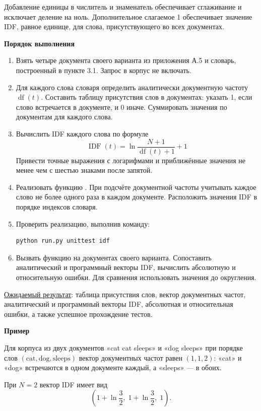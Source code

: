 \documentclass[12pt,a4paper]{article}
\newcommand{\taskhead}[1]{\par\textbf{#1}\par}
\begin{document}
Добавление единицы в числитель и знаменатель обеспечивает сглаживание
и исключает деление на ноль. Дополнительное слагаемое 1 обеспечивает
значение IDF, равное единице, для слова, присутствующего во всех документах.

\taskhead{Порядок выполнения}
\begin{enumerate}
  \item Взять четыре документа своего варианта из приложения А.5
  и словарь, построенный в пункте 3.1.
  Запрос в корпус не включать.
  \item Для каждого слова словаря определить аналитически
  документную частоту $\operatorname{df}(t)$.
  Составить таблицу присутствия слов в документах:
  указать 1, если слово встречается в документе, и 0 иначе.
  Суммировать значения по документам для каждого слова.
  \item Вычислить IDF каждого слова по формуле
  \[
  \operatorname{IDF}(t)
  =\ln\frac{N+1}{\operatorname{df}(t)+1}+1
  \]
  Привести точные выражения с логарифмами и приближённые
  значения не менее чем с шестью знаками после запятой.
  \item Реализовать функцию .
  При подсчёте документной частоты учитывать каждое слово
  не более одного раза в каждом документе.
  Расположить значения IDF в порядке индексов словаря.
  \item Проверить реализацию, выполнив команду:
  \begin{lstlisting}[style=commands]
python run.py unittest idf\end{lstlisting}
  \item Вызвать функцию на документах своего варианта.
  Сопоставить аналитический и программный векторы IDF,
  вычислить абсолютную и относительную ошибки.
  Для сравнения использовать значения до округления.
\end{enumerate}

\underline{Ожидаемый результат}: таблица присутствия слов,
вектор документных частот, аналитический и программный
векторы IDF, абсолютная и относительная ошибки,
а также успешное прохождение тестов.

\newpage

\taskhead{Пример}

Для корпуса из двух документов «cat cat sleeps» и «dog sleeps»
при порядке слов $(\text{cat},\text{dog},\text{sleeps})$
вектор документных частот равен $(1,1,2)$:
«cat» и «dog» встречаются в одном документе каждый,
а «sleeps» --- в обоих.

При $N=2$ вектор IDF имеет вид
\[
\left(1+\ln\frac{3}{2},\;1+\ln\frac{3}{2},\;1\right).
\]
\end{document}
